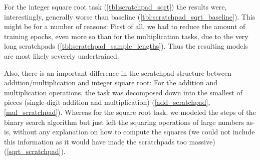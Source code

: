 For the integer square root task (\cref{tbl:scratchpad_sqrt}) the results were, interestingly, generally worse than baseline (\cref{tbl:scratchpad_sqrt_baseline}). This might be for a number of reasons:
First of all, we had to reduce the amount of training epochs, even more so than for the multiplication tasks, due to the very long scratchpads (\cref{tbl:scratchpad_sample_lengths}). Thus the resulting models are most likely severely undertrained.

Also, there is an important difference in the scratchpad structure between addition/multiplication and integer square root: For the addition and multiplication operations, the task was decomposed down into the smallest of pieces (single-digit addition and multiplication) (\cref{add_scratchpad}, \cref{mul_scratchpad}). Whereas for the square root task, we modeled the steps of the binary search algorithm but just left the squaring operations of large numbers as-is, without any explanation on how to compute the squares (we could not include this information as it would have made the scratchpads too massive) (\cref{sqrt_scratchpad}).



\begin{table}[!htbp]
	\begin{minipage}[t]{0.47\linewidth}
		\hfill
		\label{tbl:scratchpad_add_baseline}
	\end{minipage}
	\hfill %
	\begin{minipage}[t]{0.47\linewidth}
		\hfill
		\label{tbl:scratchpad_add}
	\end{minipage}
\end{table}

\begin{table}[!htbp]
	\begin{minipage}[t]{0.47\linewidth}
		\hfill
		\label{tbl:scratchpad_mul_baseline}
	\end{minipage}
	\hfill %
	\begin{minipage}[t]{0.47\linewidth}
		\hfill
		\label{tbl:scratchpad_mul}
	\end{minipage}
\end{table}

